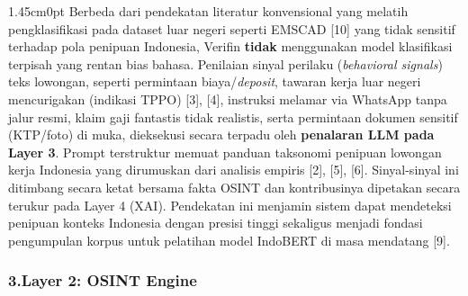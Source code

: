 \documentclass[12pt,a4paper]{article}
\begin{document}
\begin{adjustwidth}{1.45cm}{0pt}
\hspace*{0.85cm}Berbeda dari pendekatan literatur konvensional yang melatih pengklasifikasi pada dataset
luar negeri seperti EMSCAD [10] yang tidak sensitif terhadap pola penipuan Indonesia, Verifin
\textbf{tidak} menggunakan model klasifikasi terpisah yang rentan bias bahasa. Penilaian sinyal perilaku
(\textit{behavioral signals}) teks lowongan, seperti permintaan biaya/\textit{deposit},
tawaran kerja luar negeri mencurigakan (indikasi TPPO) [3], [4], instruksi melamar via WhatsApp tanpa jalur resmi,
klaim gaji fantastis tidak realistis, serta permintaan dokumen sensitif (KTP/foto) di muka, dieksekusi secara terpadu oleh
\textbf{penalaran LLM pada Layer 3}. Prompt terstruktur memuat panduan taksonomi penipuan lowongan kerja
Indonesia yang dirumuskan dari analisis empiris [2], [5], [6]. Sinyal-sinyal ini ditimbang secara ketat bersama
fakta OSINT dan kontribusinya dipetakan secara terukur pada Layer 4 (XAI). Pendekatan ini menjamin sistem
dapat mendeteksi penipuan konteks Indonesia dengan presisi tinggi sekaligus menjadi fondasi pengumpulan
korpus untuk pelatihan model IndoBERT di masa mendatang [9].
\end{adjustwidth}

\subsubsection*{3.\quad Layer 2: OSINT Engine}
\end{document}
